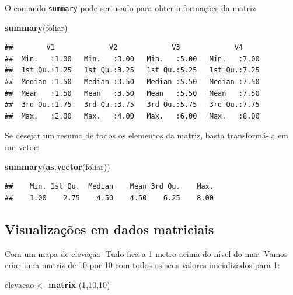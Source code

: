 \documentclass[
]{book}
\newenvironment{Shaded}{\begin{snugshade}}{\end{snugshade}}
\newcommand{\DecValTok}[1]{\textcolor[rgb]{0.00,0.00,0.81}{#1}}
\newcommand{\KeywordTok}[1]{\textcolor[rgb]{0.13,0.29,0.53}{\textbf{#1}}}
\newcommand{\NormalTok}[1]{#1}
\newcommand{\StringTok}[1]{\textcolor[rgb]{0.31,0.60,0.02}{#1}}
\begin{document}
O comando \texttt{summary} pode ser usado para obter informações da matriz

\begin{Shaded}
\begin{Highlighting}[]
\KeywordTok{summary}\NormalTok{(foliar)}
\end{Highlighting}
\end{Shaded}

\begin{verbatim}
##        V1             V2             V3             V4      
##  Min.   :1.00   Min.   :3.00   Min.   :5.00   Min.   :7.00  
##  1st Qu.:1.25   1st Qu.:3.25   1st Qu.:5.25   1st Qu.:7.25  
##  Median :1.50   Median :3.50   Median :5.50   Median :7.50  
##  Mean   :1.50   Mean   :3.50   Mean   :5.50   Mean   :7.50  
##  3rd Qu.:1.75   3rd Qu.:3.75   3rd Qu.:5.75   3rd Qu.:7.75  
##  Max.   :2.00   Max.   :4.00   Max.   :6.00   Max.   :8.00
\end{verbatim}

Se desejar um resumo de todos os elementos da matriz, basta transformá-la em um vetor:

\begin{Shaded}
\begin{Highlighting}[]
\KeywordTok{summary}\NormalTok{(}\KeywordTok{as.vector}\NormalTok{(foliar))}
\end{Highlighting}
\end{Shaded}

\begin{verbatim}
##    Min. 1st Qu.  Median    Mean 3rd Qu.    Max. 
##    1.00    2.75    4.50    4.50    6.25    8.00
\end{verbatim}

\hypertarget{visualizauxe7uxf5es-em-dados-matriciais}{%
\subsection{Visualizações em dados matriciais}\label{visualizauxe7uxf5es-em-dados-matriciais}}

Com um mapa de elevação. Tudo fica a 1 metro acima do nível do mar. Vamos criar uma matriz de 10 por 10 com todos os seus valores inicializados para 1:

\begin{Shaded}
\begin{Highlighting}[]
\NormalTok{elevacao <-}\StringTok{ }\KeywordTok{matrix}\NormalTok{ (}\DecValTok{1}\NormalTok{,}\DecValTok{10}\NormalTok{,}\DecValTok{10}\NormalTok{)}
\end{Highlighting}
\end{Shaded}
\end{document}
